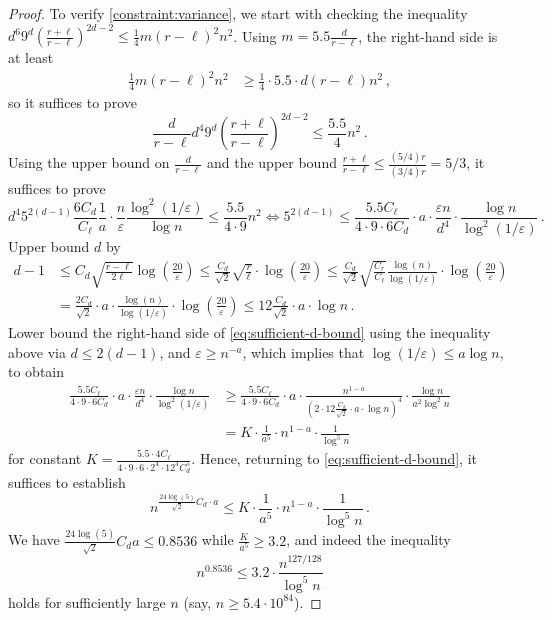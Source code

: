 \documentclass{theoretics}
\renewcommand{\epsilon}{\varepsilon}
\begin{document}
\begin{proof}
    To verify \cref{constraint:variance}, we start with checking the inequality $d^6 9^d
\left(\frac{r+\ell}{r-\ell}\right)^{2d-2} \leq \tfrac{1}{4} m(r-\ell)^2 n^2$. Using $m = 5.5
\frac{d}{r-\ell}$, the right-hand side is at least
    \begin{align*}
      \frac{1}{4} m (r-\ell)^2 n^2
      &\geq \frac{1}{4} \cdot 5.5 \cdot d (r - \ell) n^2 \,,
    \end{align*}
    so it suffices to prove
    \[
      \frac{d}{r-\ell} d^4 9^d \left(\frac{r+\ell}{r-\ell}\right)^{2d-2} \leq \frac{5.5}{4} n^2 \,.
    \]
    Using the upper bound on $\frac{d}{r-\ell}$ and the upper bound $\tfrac{r+\ell}{r-\ell} \leq
    \tfrac{(5/4)r}{(3/4)r} = 5/3$, it suffices to prove
    \begin{equation}
      \label{eq:sufficient-d-bound}
      d^4 5^{2(d-1)} \frac{6 C_d}{C_\ell} \frac{1}{a} \cdot \frac{n}{\epsilon}
        \frac{\log^2(1/\epsilon)}{\log n} \leq \frac{5.5}{4 \cdot 9} n^2 
      \iff
      5^{2(d-1)} \leq \frac{5.5 C_\ell}{4 \cdot 9 \cdot 6 C_d} \cdot a \cdot
        \frac{\epsilon n}{d^4} \cdot \frac{\log n}{\log^2(1/\epsilon)} \,.
    \end{equation}
    Upper bound $d$ by
    \begin{align*}
        d-1
        &\le C_d \sqrt{\frac{r-\ell}{2\ell}} \log \left(\frac{20}{\epsilon}\right)
        \le \frac{C_d}{\sqrt{2}} \sqrt{\frac{r}{\ell}} \cdot
            \log \left(\frac{20}{\epsilon}\right)
        \le \frac{C_d}{\sqrt{2}} \sqrt{\frac{C_r}{C_\ell}} \frac{\log(n)}{\log(1/\epsilon)}\cdot
            \log \left(\frac{20}{\epsilon}\right) \\
        &= \frac{2 C_d}{\sqrt{2}} \cdot a \cdot \frac{\log(n)}{\log(1/\epsilon)}\cdot
            \log \left(\frac{20}{\epsilon}\right)
        \leq 12\frac{C_d}{\sqrt{2}} \cdot a \cdot \log n \,.
    \end{align*}
    Lower bound the right-hand side of \eqref{eq:sufficient-d-bound} using the inequality above via
    $d \le 2(d-1)$, and $\epsilon \ge n^{-a}$, which implies that $\log(1/\epsilon) \le a \log n$,
    to obtain
    \begin{align*}
        \frac{5.5 C_\ell}{4 \cdot 9 \cdot 6 C_d} \cdot a \cdot
            \frac{\epsilon n}{d^4} \cdot \frac{\log n}{\log^2(1/\epsilon)}
        &\ge \frac{5.5 C_\ell}{4 \cdot 9 \cdot 6 C_d} \cdot a \cdot
            \frac{n^{1-a}}{\left(2 \cdot 12\frac{C_d}{\sqrt{2}} \cdot a \cdot \log n\right)^4}
            \cdot \frac{\log n}{a^2 \log^2 n} \\
        &= K \cdot \frac{1}{a^5} \cdot n^{1-a} \cdot \frac{1}{\log^5 n}
    \end{align*}
    for constant $K = \frac{5.5 \cdot 4 C_\ell}{4 \cdot 9 \cdot 6 \cdot 2^4 \cdot 12^4 C_d^5}$.
    Hence, returning to \eqref{eq:sufficient-d-bound}, it suffices to establish
    \[
      n^{\tfrac{24\log(5)}{\sqrt 2} C_d \cdot a} \leq K \cdot \frac{1}{a^5} \cdot n^{1-a} \cdot
        \frac{1}{\log^5 n} \,.
    \]
    We have $\frac{24 \log(5)}{\sqrt{2}} C_d a \le 0.8536$ while $\frac{K}{a^5} \ge 3.2$, and indeed
    the inequality
    \[
        n^{0.8536} \le 3.2 \cdot \frac{n^{127/128}}{\log^5 n}
    \]
    holds for sufficiently large $n$ (say, $n \ge 5.4 \cdot 10^{84}$).


\end{proof}
\end{document}

